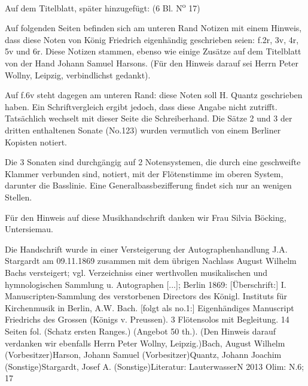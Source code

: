 \documentclass[a4paper, twocolumn, 11pt]{book}
\begin{document}
\par Auf dem Titelblatt, später hinzugefügt: {\textquotedbl}(6 Bl. N\textsuperscript{o} 17){\textquotedbl}
\par Auf folgenden Seiten befinden sich am unteren Rand Notizen mit einem Hinweis, dass {\textquotedbl}diese Noten{\textquotedbl} von König Friedrich eigenhändig geschrieben seien: f.2r, 3v, 4r, 5v und 6r. Diese Notizen stammen, ebenso wie einige Zusätze auf dem Titelblatt von der Hand Johann Samuel Harsons. (Für den Hinweis darauf sei Herrn Peter Wollny, Leipzig, verbindlichst gedankt).
\par Auf f.6v steht dagegen am unteren Rand: {\textquotedbl}diese Noten soll H. Quantz geschrieben haben.{\textquotedbl} Ein Schriftvergleich ergibt jedoch, dass diese Angabe nicht zutrifft. Tatsächlich wechselt mit dieser Seite die Schreiberhand. Die Sätze 2 und 3 der dritten enthaltenen Sonate (No.123) wurden vermutlich von einem Berliner Kopisten notiert.
\par Die 3 Sonaten sind durchgängig auf 2 Notensystemen, die durch eine geschweifte Klammer verbunden sind, notiert, mit der Flötenstimme im oberen System, darunter die Basslinie. Eine Generalbassbezifferung findet sich nur an wenigen Stellen.
\par Für den Hinweis auf diese Musikhandschrift danken wir Frau Silvia Böcking, Untersiemau.
\par Die Handschrift wurde in einer Versteigerung der Autographenhandlung J.A. Stargardt am 09.11.1869 zusammen mit dem übrigen Nachlass August Wilhelm Bachs versteigert; vgl. {\textquotedbl}Verzeichniss einer werthvollen musikalischen und hymnologischen Sammlung u. Autographen [...]{\textquotedbl}; Berlin 1869: [Überschrift:] {\textquotedbl}I. Manuscripten-Sammlung des verstorbenen Directors des Königl. Instituts für Kirchenmusik in Berlin, A.W. Bach.{\textquotedbl} [folgt als no.1:] {\textquotedbl}Eigenhändiges Manuscript Friedrichs des Grossen (Königs v. Preussen). 3 Flötensolos mit Begleitung. 14 Seiten fol. (Schatz ersten Ranges.) (Angebot 50 th.){\textquotedbl}. (Den Hinweis darauf verdanken wir ebenfalls Herrn Peter Wollny, Leipzig.)\newline Bach, August Wilhelm  (Vorbesitzer)\newline Harson, Johann Samuel  (Vorbesitzer)\newline Quantz, Johann Joachim  (Sonstige)\newline Stargardt, Josef A.  (Sonstige)\newline Literatur: LauterwasserN 2013  \newline Olim: N.6; 17
\end{document}
